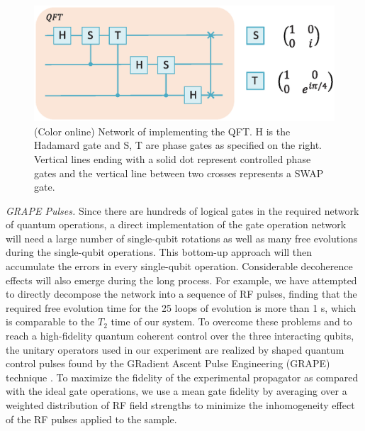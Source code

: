 \documentclass[twocolumn,showpacs,twoside,10pt,prl]{revtex4}
\begin{document}
\begin{figure}[h]
\includegraphics[width= 0.95\columnwidth]{qft.eps}
\caption{\footnotesize{(Color online) Network of implementing the QFT. H is the Hadamard gate and S, T are phase gates as specified on the right. Vertical lines ending with a solid dot represent controlled phase gates and the
vertical line between two crosses represents a SWAP gate.}}
\label{qft}
\end{figure}

{\it GRAPE Pulses.} Since there are hundreds of logical gates in the required network of quantum operations, a direct implementation of the gate operation network will need a large number of single-qubit rotations as well as many free evolutions during the single-qubit operations. This bottom-up approach will
then accumulate the errors in every single-qubit operation. Considerable decoherence effects will also emerge during the long process. For example,
we have attempted to directly decompose the network into a sequence of RF pulses, finding that the required free evolution time for the 25 loops of evolution is more than 1 s, which is comparable to the $T_2$ time of our system.
To overcome these problems and to reach a high-fidelity quantum coherent control over the three interacting qubits, the unitary operators used in our experiment are realized by shaped quantum control pulses found by the GRadient Ascent Pulse Engineering (GRAPE) technique \cite{grape1-2,grape2-2,grape3-2}.
To maximize the fidelity of the experimental propagator as compared with the ideal gate operations, we use a mean gate fidelity by averaging over a weighted distribution of RF field strengths to minimize the inhomogeneity effect of the RF pulses applied to the sample.
\end{document}
